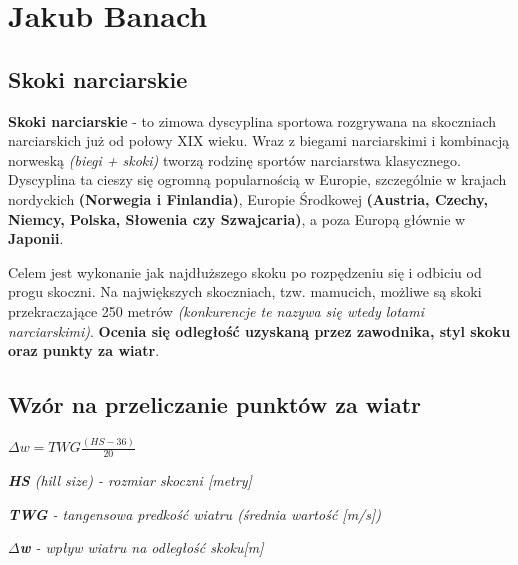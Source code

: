 \newpage
\section{Jakub Banach}
\label{sec:skoki}
\subsection{Skoki narciarskie}
    
    \hspace{0.5cm}\textbf{Skoki narciarskie} - to zimowa dyscyplina sportowa rozgrywana na skoczniach narciarskich już od połowy XIX wieku. Wraz z biegami narciarskimi i kombinacją norweską \emph{(biegi + skoki)} tworzą rodzinę sportów narciarstwa klasycznego. Dyscyplina ta cieszy się ogromną popularnością w Europie, szczególnie w krajach nordyckich \textbf{(Norwegia i Finlandia)}, Europie Środkowej \textbf{(Austria, Czechy, Niemcy, Polska, Słowenia czy Szwajcaria)}, a poza Europą głównie w \textbf{Japonii}. \par
    
    Celem jest wykonanie jak najdłuższego skoku po rozpędzeniu się i odbiciu od progu skoczni. Na największych skoczniach, tzw. mamucich, możliwe są skoki przekraczające 250 metrów \emph{(konkurencje te nazywa się wtedy lotami narciarskimi)}. \textbf{Ocenia się odległość uzyskaną przez zawodnika, styl skoku oraz punkty za wiatr}. \par

\subsection{Wzór na przeliczanie punktów za wiatr}
    \begin{center}
    $\Delta w = TWG \frac{(HS-36)}{20}$ 
    \end{center}
    \begin{center}
    \emph{\textbf{HS} (hill size) - rozmiar skoczni [metry]} \par
    \emph{\textbf{TWG} - tangensowa predkość wiatru (średnia wartość [m/s])}\par
    \emph{\textbf{$\Delta $w} - wpływ wiatru na odległość skoku[m]}\par
    \end{center}

